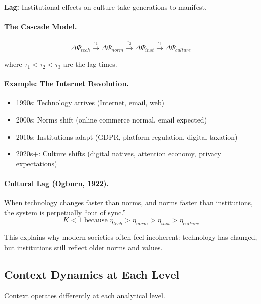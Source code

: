 \documentclass[12pt,a4paper]{article}
\begin{document}
\textbf{Lag:} Institutional effects on culture take generations to manifest.

\paragraph{The Cascade Model.}
\begin{equation}
  \Delta \Psi_{tech} \xrightarrow{\tau_1} \Delta \Psi_{norm} 
                     \xrightarrow{\tau_2} \Delta \Psi_{inst} 
                     \xrightarrow{\tau_3} \Delta \Psi_{culture}
\end{equation}

where $\tau_1 < \tau_2 < \tau_3$ are the lag times.

\paragraph{Example: The Internet Revolution.}
\begin{itemize}
  \item 1990s: Technology arrives (Internet, email, web)
  \item 2000s: Norms shift (online commerce normal, email expected)
  \item 2010s: Institutions adapt (GDPR, platform regulation, digital taxation)
  \item 2020s+: Culture shifts (digital natives, attention economy, privacy expectations)
\end{itemize}

\paragraph{Cultural Lag (Ogburn, 1922).}
When technology changes faster than norms, and norms faster than institutions,
the system is perpetually ``out of sync.''
\begin{equation}
  K < 1 \text{ because } \eta_{tech} > \eta_{norm} > \eta_{inst} > \eta_{culture}
\end{equation}

This explains why modern societies often feel incoherent:
technology has changed, but institutions still reflect older norms and values.

\subsection{Context Dynamics at Each Level}

Context operates differently at each analytical level.
\end{document}
